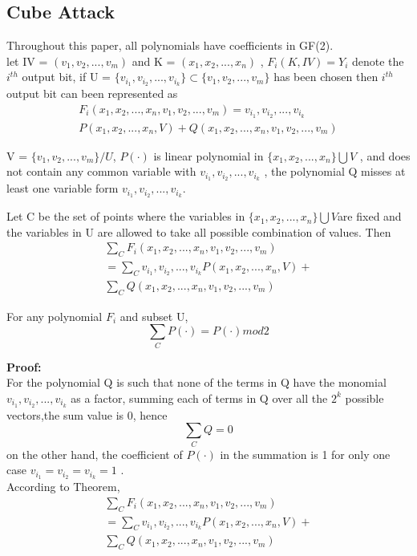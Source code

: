 \subsection{Cube Attack}
Throughout this paper, all polynomials have coefficients in GF(2).\\ let IV = $(v_1,v_2,...,v_m)$ and K = $(x_1,x_2,...,x_n)$ , $F_i(K,IV) = Y_i$ denote the $i^{th}$ output bit, if U =  $\{v_{i_1},v_{i_2},...,v_{i_k}\} \subset \{v_1,v_2,...,v_m\}$ has been chosen then $i^{th}$ output bit can been represented as 
\begin{multline}
F_i(x_1,x_2,...,x_n,v_1,v_2,...,v_m) = v_{i_1},v_{i_2},...,v_{i_k}\\P(x_1,x_2,...,x_n,V)+Q(x_1,x_2,...,x_n,v_1,v_2,...,v_m)
\end{multline}
\begin{question}
	V = $\{ v_1,v_2,...,v_m \} / U $, $P ( \cdot )$ is linear polynomial in $\{x_1,x_2,...,x_n \} \bigcup  V$ , and does not contain any common variable with $v_{i_1},v_{i_2},...,v_{i_k}$ , the polynomial Q misses at least one variable form $v_{i_1},v_{i_2},...,v_{i_k}$.
\end{question}
Let C be the set of points where the variables
in $\{ x_1,x_2,...,x_n \} \bigcup V $are fixed and the variables in U are allowed to take all possible
combination of values. Then
\begin{multline}\sum_{C} F_i(x_1,x_2,...,x_n,v_1,v_2,...,v_m) \\= \sum_{C}v_{i_1},v_{i_2},...,v_{i_k}P(x_1,x_2,...,x_n,V) + \\\sum_{C}Q(x_1,x_2,...,x_n,v_1,v_2,...,v_m)\end{multline}
 \begin{theorm}
 	For any polynomial $F_i$ and subset U,\\ $$\sum_C P(\cdot) = P(\cdot) mod 2$$
 \end{theorm}
\textbf{Proof:} \\
For the polynomial Q is such that none of the terms in Q have the monomial
$v_{i_1},v_{i_2},...,v_{i_k}$ as a factor, summing each of terms in Q over all the $2^k$ possible vectors,the sum value is 0, hence $$\sum_{C}Q=0$$ on the other hand, the coefficient of $P (\cdot)$ in the summation is 1 for only one case $v_{i_1}=v_{i_2}=v_{i_k}=1$ . \\
According to Theorem,
\begin{multline}\sum_{C} F_i(x_1,x_2,...,x_n,v_1,v_2,...,v_m) \\= \sum_{C}v_{i_1},v_{i_2},...,v_{i_k}P(x_1,x_2,...,x_n,V) + \\\sum_{C}Q(x_1,x_2,...,x_n,v_1,v_2,...,v_m)\end{multline}
\cite{wang2013improved}
